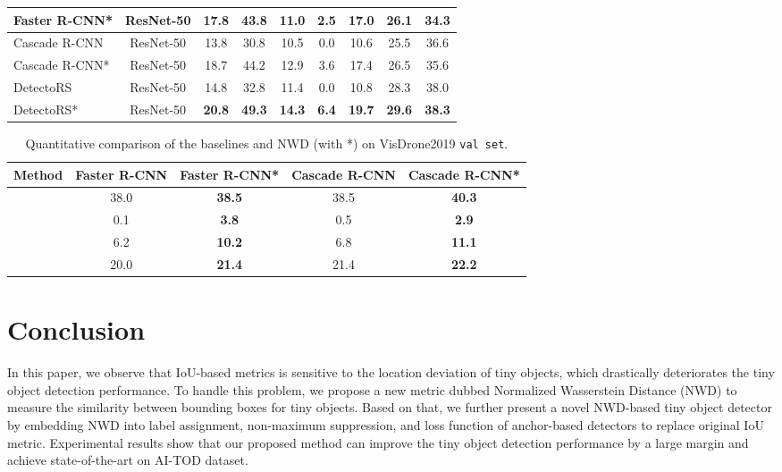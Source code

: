 \documentclass{article}
\begin{document}
\begin{table*}[t]
\begin{tabular}{|l|c|ccccccc|}
	 Faster R-CNN*                              & ResNet-50 	& 17.8	& 43.8  & 11.0  & 2.5 & 17.0 & 26.1 & 34.3 \\
	 \hline
	 Cascade R-CNN~\cite{Cascade-R-CNN_2018_CVPR}& ResNet-50 	& 13.8	& 30.8  & 10.5 & 0.0 & 10.6 & 25.5 &  36.6 \\
	 Cascade R-CNN*                             & ResNet-50 	& 18.7	& 44.2  & 12.9 & 3.6 & 17.4 & 26.5 & 35.6 \\
	 \hline
	 DetectoRS~\cite{DetectoRS_2020_arXiv}      & ResNet-50 	& 14.8	& 32.8  & 11.4 & 0.0 & 10.8 & 28.3 & 38.0 \\
	 DetectoRS*                                 & ResNet-50 	& \textbf{20.8}	& \textbf{49.3}  & \textbf{14.3} & \textbf{6.4} & \textbf{19.7} & \textbf{29.6} & \textbf{38.3} \\
	\hline
	\end{tabular}
	\label{tab:baselines}
	\vspace{-2mm}
\end{table*}

\begin{table}
	\centering
	\setlength{\belowcaptionskip}{0.1cm}
	\renewcommand{\arraystretch}{0.92}
	\caption{Quantitative comparison of the baselines and NWD (with *) on VisDrone2019 {\tt val set}.}
	\begin{tabular}{|l|cc|cc|}  
	\hline
	Method  & Faster R-CNN & Faster R-CNN* & Cascade R-CNN & Cascade R-CNN*  \\
	\hline
	  & 38.0 & \textbf{38.5} & 38.5 & \textbf{40.3} \\
	   & 0.1 & \textbf{3.8} & 0.5 & \textbf{2.9} \\
	   & 6.2 & \textbf{10.2} & 6.8 & \textbf{11.1} \\
	   & 20.0 & \textbf{21.4} & 21.4 & \textbf{22.2} \\
	\hline
	\end{tabular}
	\label{tab:visdrone}
	\vspace{-5mm}
\end{table}

\section{Conclusion}
In this paper, we observe that IoU-based metrics is sensitive to the location deviation of tiny objects, which drastically deteriorates the tiny object detection performance. To handle this problem, we propose a new metric dubbed Normalized Wasserstein Distance (NWD) to measure the similarity between bounding boxes for tiny objects. Based on that, we further present a novel NWD-based tiny object detector by embedding NWD into label assignment, non-maximum suppression, and loss function of anchor-based detectors to replace original IoU metric. Experimental results show that our proposed method can improve the tiny object detection performance by a large margin and achieve state-of-the-art on AI-TOD dataset. 





\medskip

{


}
\end{document}
